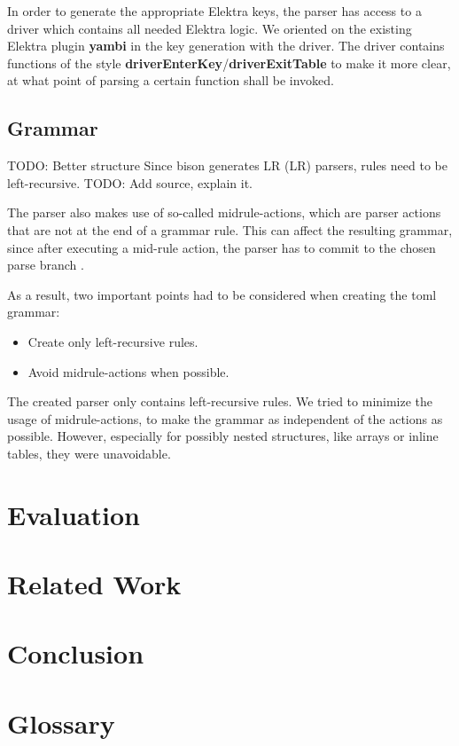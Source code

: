 \documentclass[12pt]{report}
\begin{document}
In order to generate the appropriate Elektra keys, the parser has access to a driver which contains all needed Elektra logic.
We oriented on the existing Elektra plugin \textbf{yambi}\cite{elektrayambi} in the key generation with the driver.
The driver contains functions of the style \textbf{driverEnterKey}/\textbf{driverExitTable} to make it more clear, at what point of parsing a certain function shall be invoked.

\section{Grammar}
TODO: Better structure
Since bison generates \acrshort{LR} (\acrlong{LR}) parsers, rules need to be left-recursive.
TODO: Add source, explain it.

The parser also makes use of so-called midrule-actions, which are parser actions that are not at the end of a grammar rule.
This can affect the resulting grammar, since after executing a mid-rule action, the parser has to commit to the chosen parse branch \cite{bisonmidruleconflicts}.

As a result, two important points had to be considered when creating the toml grammar:
\begin{itemize}
	\item Create only left-recursive rules.
	\item Avoid midrule-actions when possible.
\end{itemize}

The created parser only contains left-recursive rules.
We tried to minimize the usage of midrule-actions, to make the grammar as independent of the actions as possible.
However, especially for possibly nested structures, like arrays or inline tables, they were unavoidable.

\chapter*{Evaluation}

\chapter*{Related Work}

\chapter*{Conclusion}

\chapter*{Glossary}

\printglossary[type=\acronymtype]

{}

\end{document}

